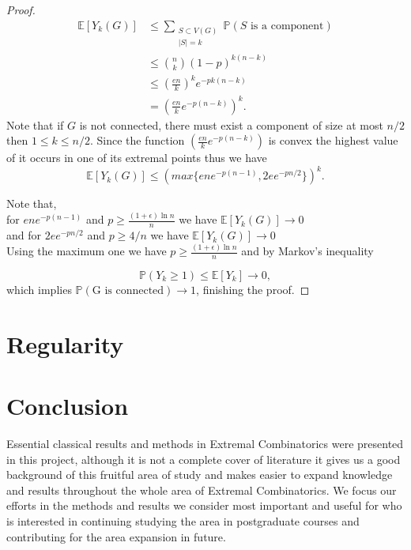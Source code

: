 \documentclass[12pt,twoside,a4paper]{book}
\numberwithin{equation}{section}
\let\log=\ln
\theoremstyle{remark}
\begin{document}
\begin{proof}
\begin{align*}
\mathbb{E}[Y_k (G)]  & \leq \sum_{\substack{S\subset V(G) \\ |S| = k}} \mathbb{P}(S\text{ is a component})\\
&\leq \binom{n}{k}(1-p)^{k(n-k)}\\
&\leq \left( \frac{en}{k} \right) ^k e^{-pk(n-k)}\\
& = \left( \frac{en}{k} e^{-p(n-k)} \right)^k.
\end{align*}
Note that if $G$ is not connected, there must exist a component of size at most $ n/2$ then $1 \leq k \leq n/2$. Since the function $\left( \frac{en}{k} e^{-p(n-k)} \right)$ is convex the highest value of it occurs in one of its extremal points thus we have
$$\mathbb{E}[Y_k (G)] \leq (max\{ene^{-p(n-1)}, 2ee^{-pn/2}\})^k .$$

Note that, \\
for $ene^{-p(n-1)}$ and $p \geq \frac{(1 + \epsilon) \log n}{n}$ we have $\mathbb{E}[Y_k (G)] \rightarrow 0$\\
and for $2ee^{-pn/2}$ and $p \geq 4/n$ we have $\mathbb{E}[Y_k (G)] \rightarrow 0$\\

Using the maximum one we have $p \geq \frac{(1 + \epsilon) \log n}{n}$  and by Markov's inequality

 $$\mathbb{P}(Y_k \geq 1) \leq \mathbb{E}[Y_k] \rightarrow 0,$$
 which implies $\mathbb{P}(\text{G is connected}) \rightarrow 1$, finishing the proof.

\end{proof}
\chapter{Regularity}

\chapter{Conclusion}
Essential classical results and methods in Extremal Combinatorics were presented in this project, although it is not a complete cover of literature it gives us a good background of this fruitful area of study and makes easier to expand knowledge and results throughout the whole area of Extremal Combinatorics. We focus our efforts in the methods and results we consider most important and useful for who is interested in continuing studying the area in postgraduate courses and contributing for the area expansion in future.
\end{document}
